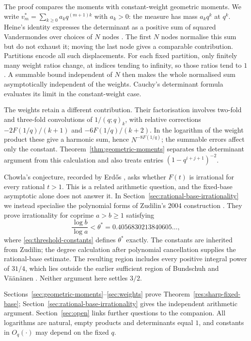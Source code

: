 \documentclass[11pt]{article}
\begin{document}
The proof compares the moments with constant-weight geometric
moments. We write $v_m^*=\sum_{k\ge0}a_kq^{(m+1)k}$ with $a_k>0$:
the measure has mass $a_kq^k$ at $q^k$. Heine's identity expresses
the determinant as a positive sum of squared Vandermondes over
choices of $N$ nodes \cite[\S2, (2)--(5)]{zudilin2017det}.
The first $N$ nodes normalise this sum but do not exhaust it;
moving the last node gives a comparable contribution. Partitions
encode all such displacements. For each fixed partition, only
finitely many weight ratios change, at indices tending to infinity,
so those ratios tend to $1$. A summable bound independent of $N$
then makes the whole normalised sum asymptotically independent of
the weights. Cauchy's determinant formula evaluates its limit in
the constant-weight case.

The weights retain a different contribution. Their factorisation
involves two-fold and three-fold convolutions of $1/(q;q)_k$,
with relative corrections $-2F(1/q)/(k+1)$ and $-6F(1/q)/(k+2)$.
In the logarithm of the weight product these give a harmonic sum,
hence $N^{-8F(1/q)}$; the summable errors affect only the constant.
Theorem~\ref{thm:geometric-moments} separates the determinant argument
from this calculation and also treats entries $(1-q^{i+j+1})^{-2}$.

Chowla's conjecture, recorded by Erd\H{o}s
\cite[p.~102]{erdos1988}, asks whether $F(t)$ is irrational for every
rational $t>1$. This is a related arithmetic question, and the
fixed-base asymptotic alone does not answer it. In
Section~\ref{sec:rational-base-irrationality} we instead specialise
the polynomial forms of Zudilin's 2004 construction
\cite[\S5]{zudilin2004}. They prove irrationality for coprime
$a>b\ge1$ satisfying
\[
 \frac{\log b}{\log a}<\theta^*
 =0.4056830213840605\ldots,
\]
where \eqref{eq:threshold-constants} defines $\theta^*$ exactly.
The constants are inherited from Zudilin; the degree calculation
after polynomial cancellation supplies the rational-base estimate.
The resulting region includes every positive integral power of
$31/4$, which lies outside the earlier sufficient region of
Bundschuh and V\"a\"an\"anen \cite[Theorem~2]{bv1994}. Neither
argument here settles $3/2$.

Sections~\ref{sec:geometric-moments}--\ref{sec:weights} prove
Theorem~\ref{res:sharp-fixed-base};
Section~\ref{sec:rational-base-irrationality} gives the independent
arithmetic argument. Section~\ref{sec:open} links further questions
to the companion. All logarithms are natural, empty products and
determinants equal $1$, and constants in $O_q(\cdot)$ may depend on
the fixed $q$.
\end{document}
